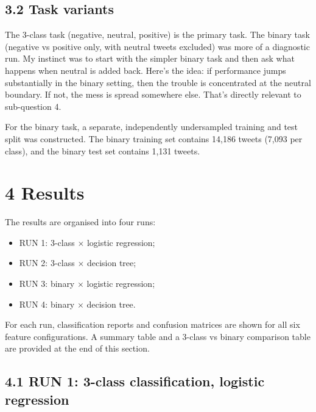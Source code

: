 \documentclass[12pt]{article}
\begin{document}
\subsection*{3.2 Task variants}



The 3-class task (negative, neutral, positive) is the primary task. The binary task (negative vs positive only, with neutral tweets excluded) was more of a diagnostic run. My instinct was to start with the simpler binary task and then ask what happens when neutral is added back. Here's the idea: if performance jumps substantially in the binary setting, then the trouble is concentrated at the neutral boundary. If not, the mess is spread somewhere else. That's directly relevant to sub-question 4.

For the binary task, a separate, independently undersampled training and test split was constructed. The binary training set contains 14,186 tweets (7,093 per class), and the binary test set contains 1,131 tweets.



\section*{4 Results}



The results are organised into four runs:

\begin{itemize}

  \item RUN 1: 3-class $\times$ logistic regression;

  \item RUN 2: 3-class $\times$ decision tree;

  \item RUN 3: binary $\times$ logistic regression;

  \item RUN 4: binary $\times$ decision tree.

\end{itemize} For each run, classification reports and confusion matrices are shown for all six feature configurations. A summary table and a 3-class vs binary comparison table are provided at the end of this section.



\subsection*{4.1 RUN 1: 3-class classification, logistic regression}
\end{document}
